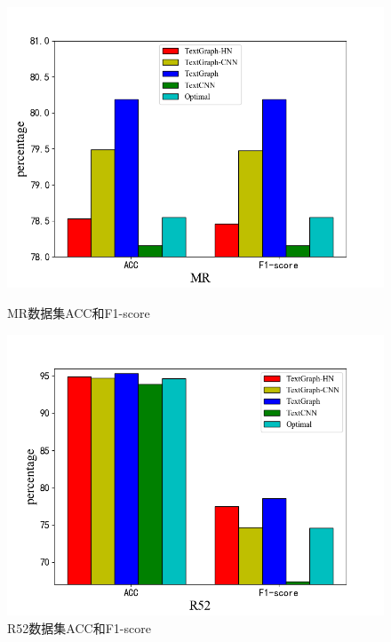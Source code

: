 \begin{figure}[htb]
    \begin{minipage}[t]{0.5\linewidth}
    \centering
    \includegraphics[width=1\textwidth]{pic/HisMR.png}
    \caption{MR数据集ACC和F1-score}
    \label{MR_acc_f1}
    \end{minipage}
    \quad
    \begin{minipage}[t]{0.5\linewidth}
    \centering
    \includegraphics[width=1\textwidth]{pic/HisR52.png}
    \caption{R52数据集ACC和F1-score}
    \label{R52_acc_f1}
    \end{minipage}
\end{figure}

